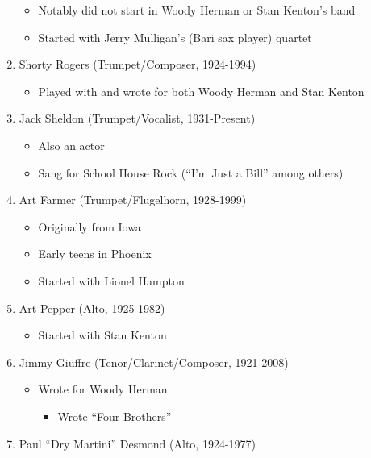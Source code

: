 \documentclass[]{article}
\providecommand{\tightlist}{%
  \setlength{\itemsep}{0pt}\setlength{\parskip}{0pt}}
\begin{document}
\begin{enumerate}
  \begin{itemize}
  \tightlist
  \item
    Notably did not start in Woody Herman or Stan Kenton's band
  \item
    Started with Jerry Mulligan's (Bari sax player) quartet
  \end{itemize}
\item
  Shorty Rogers (Trumpet/Composer, 1924-1994)

  \begin{itemize}
  \tightlist
  \item
    Played with and wrote for both Woody Herman and Stan Kenton
  \end{itemize}
\item
  Jack Sheldon (Trumpet/Vocalist, 1931-Present)

  \begin{itemize}
  \tightlist
  \item
    Also an actor
  \item
    Sang for School House Rock (``I'm Just a Bill'' among others)
  \end{itemize}
\item
  Art Farmer (Trumpet/Flugelhorn, 1928-1999)

  \begin{itemize}
  \tightlist
  \item
    Originally from Iowa
  \item
    Early teens in Phoenix
  \item
    Started with Lionel Hampton
  \end{itemize}
\item
  Art Pepper (Alto, 1925-1982)

  \begin{itemize}
  \tightlist
  \item
    Started with Stan Kenton
  \end{itemize}
\item
  Jimmy Giuffre (Tenor/Clarinet/Composer, 1921-2008)

  \begin{itemize}
  \tightlist
  \item
    Wrote for Woody Herman

    \begin{itemize}
    \tightlist
    \item
      Wrote ``Four Brothers''
    \end{itemize}
  \end{itemize}
\item
  Paul ``Dry Martini'' Desmond (Alto, 1924-1977)


\end{enumerate}
\end{document}
